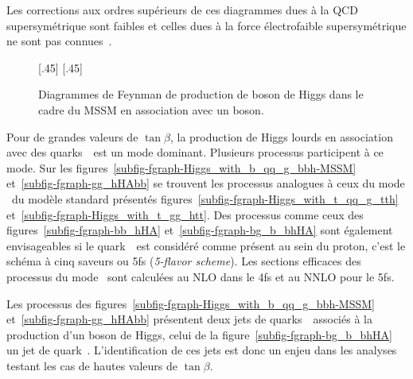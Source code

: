 Les corrections aux ordres supérieurs de ces diagrammes dues à la QCD supersymétrique sont faibles et celles dues à la force électrofaible supersymétrique ne sont pas connues~\cite{Higgs_xsec_book_1}.
\begin{figure}[h]
\centering
\vspace{\baselineskip}
[.45\textwidth]
{\vspace{\baselineskip}}
\hfill
{}[.45\textwidth]
{\vspace{\baselineskip}}
\caption[Production de boson de Higgs du MSSM en association avec un boson.]{Diagrammes de Feynman de production de boson de Higgs dans le cadre du MSSM en association avec un boson.}
\label{fig-fgraph-Higgs_prod_VH_ggZh-MSSM}
\end{figure}
\par Pour de grandes valeurs de $\tan\beta$, la production de Higgs lourds en association avec des quarks~\quarkb\ est un mode dominant.
Plusieurs processus participent à ce mode.
Sur les figures~\ref{subfig-fgraph-Higgs_with_b_qq_g_bbh-MSSM} et~\ref{subfig-fgraph-gg_hHAbb} se trouvent les processus analogues à ceux du mode \quarkt\antiquarkt\higgs\ du modèle standard présentés figures~\ref{subfig-fgraph-Higgs_with_t_qq_g_tth} et~\ref{subfig-fgraph-Higgs_with_t_gg_htt}.
Des processus comme ceux des figures~\ref{subfig-fgraph-bb_hHA} et~\ref{subfig-fgraph-bg_b_bhHA} sont également envisageables si le quark~\quarkb\ est considéré comme présent au sein du proton, c'est le \og schéma à cinq saveurs \fg{} ou 5fs (\emph{5-flavor scheme}).
Les sections efficaces des processus du mode \quarkb\antiquarkb\higgs\ sont calculées au NLO dans le 4fs et au NNLO pour le 5fs.
\par Les processus des figures~\ref{subfig-fgraph-Higgs_with_b_qq_g_bbh-MSSM} et~\ref{subfig-fgraph-gg_hHAbb} présentent deux jets de quarks~\quarkb\ associés à la production d'un boson de Higgs, celui de la figure~\ref{subfig-fgraph-bg_b_bhHA} un jet de quark~\quarkb.
L'identification de ces jets est donc un enjeu dans les analyses testant les cas de hautes valeurs de $\tan\beta$.
